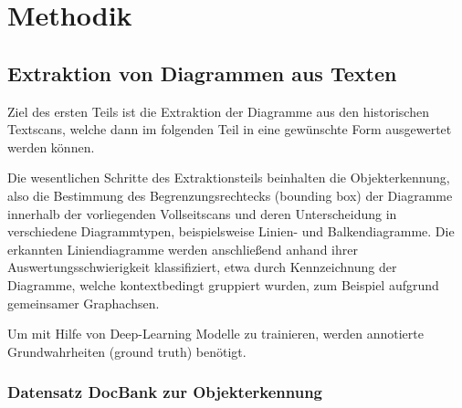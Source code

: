 \chapter{Methodik}
\label{ch:methodik}

\section{Extraktion von Diagrammen aus Texten}

Ziel des ersten Teils ist die Extraktion der Diagramme aus den historischen Textscans, welche dann im folgenden Teil in eine gewünschte Form ausgewertet werden können.

Die wesentlichen Schritte des Extraktionsteils beinhalten die Objekterkennung, also die Bestimmung des Begrenzungsrechtecks (bounding box) der Diagramme innerhalb der vorliegenden Vollseitscans und deren Unterscheidung in verschiedene Diagrammtypen, beispielsweise Linien- und Balkendiagramme.
Die erkannten Liniendiagramme werden anschließend anhand ihrer Auswertungsschwierigkeit klassifiziert, etwa durch Kennzeichnung der Diagramme, welche kontextbedingt gruppiert wurden, zum Beispiel aufgrund gemeinsamer Graphachsen.

Um mit Hilfe von Deep-Learning Modelle zu trainieren, werden annotierte Grundwahrheiten (ground truth) benötigt.
\subsection{Datensatz DocBank zur Objekterkennung}
\label{ch:chartbank}

